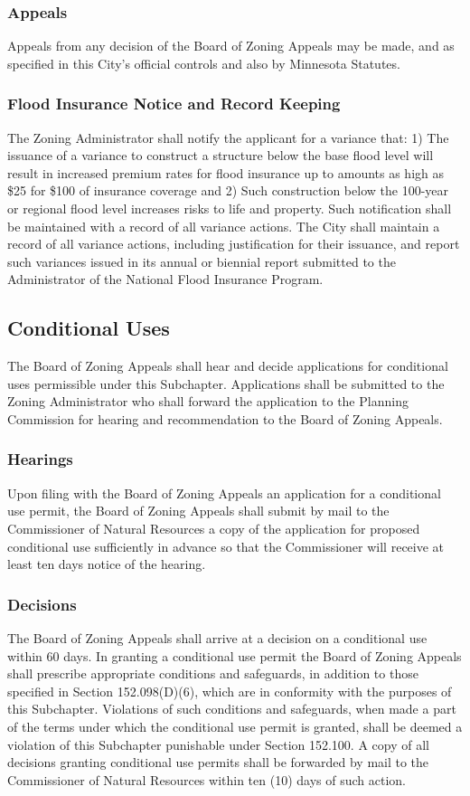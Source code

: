 \subsubsection{Appeals}
Appeals from any decision of the Board of Zoning Appeals may be made, and as specified in this City’s official controls and also by Minnesota Statutes.
\subsubsection{Flood Insurance Notice and Record Keeping}
The Zoning Administrator shall notify the applicant for a variance that: 1) The issuance of a variance to construct a structure below the base flood level will result in increased premium rates for flood insurance up to amounts as high as \$25 for \$100 of insurance coverage and 2) Such construction below the 100-year or regional flood level increases risks to life and property. Such notification shall be maintained with a record of all variance actions. The City shall maintain a record of all variance actions, including justification for their issuance, and report such variances issued in its annual or biennial report submitted to the Administrator of the National Flood Insurance Program.
\subsection{Conditional Uses}
The Board of Zoning Appeals shall hear and decide applications for conditional uses permissible under this Subchapter. Applications shall be submitted to the Zoning Administrator who shall forward the application to the Planning Commission for hearing and recommendation to the Board of Zoning Appeals.
\subsubsection{Hearings}
Upon filing with the Board of Zoning Appeals an application for a conditional use permit, the Board of Zoning Appeals shall submit by mail to the Commissioner of Natural Resources a copy of the application for proposed conditional use sufficiently in advance so that the Commissioner will receive at least ten days notice of the hearing.
\subsubsection{Decisions}
The Board of Zoning Appeals shall arrive at a decision on a conditional use within 60 days. In granting a conditional use permit the Board of Zoning Appeals shall prescribe appropriate conditions and safeguards, in addition to those specified in Section 152.098(D)(6), which are in conformity with the purposes of this Subchapter. Violations of such conditions and safeguards, when made a part of the terms under which the conditional use permit is granted, shall be deemed a violation of this Subchapter punishable under Section 152.100. A copy of all decisions granting conditional use permits shall be forwarded by mail to the Commissioner of Natural Resources within ten (10) days of such action.
